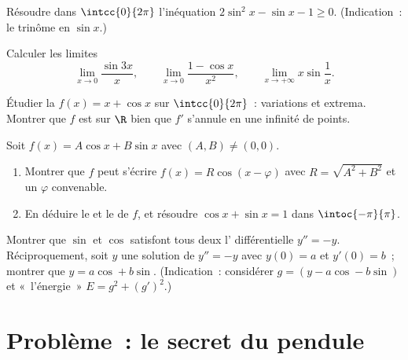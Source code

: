 \begin{exercise}[$\star\star$]\label{exo:g12:trigo:5}
Résoudre dans $\intcc{0}{2\pi}$ l'inéquation
$2\sin^2 x - \sin x - 1 \geq 0$.
(Indication~:  le trinôme en $\sin x$.)
\end{exercise}

\begin{exercise}[$\star\star$]\label{exo:g12:trigo:6}
Calculer les limites
\[
\lim_{x\to0} \frac{\sin 3x}{x}, \qquad
\lim_{x\to0} \frac{1 - \cos x}{x^2}, \qquad
\lim_{x\to+\infty} x \sin\frac{1}{x}.
\]
\end{exercise}

\begin{exercise}[$\star\star$]\label{exo:g12:trigo:7}
Étudier la  $f(x) = x + \cos x$ sur $\intcc{0}{2\pi}$~: variations
et extrema. Montrer que $f$ est  sur $\R$ bien que $f'$
s'annule en une infinité de points.
\end{exercise}

\begin{exercise}[$\star\star\star$]\label{exo:g12:trigo:8}
Soit $f(x) = A\cos x + B \sin x$ avec $(A,B) \neq (0,0)$.
\begin{enumerate}
  \item Montrer que $f$ peut s'écrire $f(x) = R\cos(x - \varphi)$ avec
        $R = \sqrt{A^2 + B^2}$ et un $\varphi$ convenable.
  \item En déduire le  et le  de $f$, et résoudre
        $\cos x + \sin x = 1$ dans $\intoc{-\pi}{\pi}$.
\end{enumerate}
\end{exercise}

\begin{exercise}[$\star\star\star$]\label{exo:g12:trigo:9}
Montrer que $\sin$ et $\cos$ satisfont tous deux l' différentielle
$y'' = -y$. Réciproquement, soit $y$ une solution de $y'' = -y$ avec
$y(0) = a$ et $y'(0) = b$~; montrer que $y = a\cos + b\sin$.
(Indication~: considérer $g = (y - a\cos - b\sin)$ et «~l'énergie~»
$E = g^2 + (g')^2$.)
\end{exercise}

\section{Problème~: le secret du pendule}


